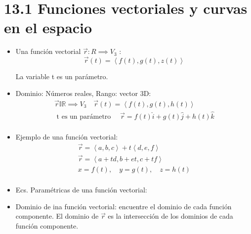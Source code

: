 \section{13.1 Funciones vectoriales y curvas en el espacio}
\begin{itemize}
    \item Una función vectorial $\vec{r}: R \implies V_3$ :
    \[
      \vec{r}(t) = \left\langle f(t),g(t),z(t) \right\rangle 
    \]
    
    La variable t es un parámetro.
    
    \item Dominio: Números reales, Rango: vector 3D:
        \begin{align*}
            \vec{r} \mathbb{IR} \implies V_3 \quad \vec{r}(t) = \left\langle f(t),g(t),h(t) \right\rangle \\ 
            \text{  t es un parámetro  } \quad \vec{r} = f(t)\hat{i} + g(t)\hat{j} + h(t)\hat{k} \\
        \end{align*}
    
    \item Ejemplo de una función vectorial:
        \begin{align*}
            \vec{r} = \left\langle a,b,c \right\rangle  + t \left\langle d,e,f \right\rangle \\ 
            \vec{r} = \left\langle a+td,b+et,c+tf \right\rangle \\ 
            x = f(t), \quad y = g(t), \quad z = h(t) \\ 
        \end{align*}
    
    \item Ecs. Paramétricas de una función vectorial: 
    
    \item Dominio de ina función vectorial: encuentre el dominio de cada función componente. El dominio de $\vec{r}$ es la intersección de los dominios de cada función componente.
\end{itemize}

